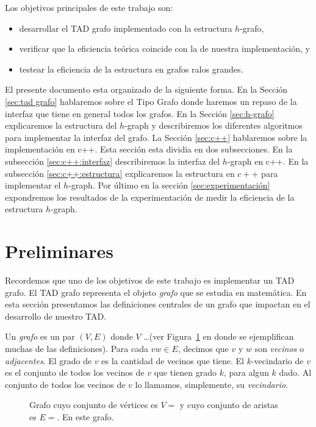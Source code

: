 \documentclass[a4paper,12pt]{article}
\begin{document}
Los objetivos principales de este trabajo son:
\begin{itemize}
  \item desarrollar el TAD grafo implementado con la estructura $h$-grafo,
  \item verificar que la eficiencia teórica coincide con la de nuestra implementación, y
  \item testear la eficiencia de la estructura en grafos ralos grandes.
\end{itemize}

El presente documento esta organizado de la siguiente forma.  En la Sección \ref{sec:tad grafo} hablaremos sobre el Tipo Grafo donde haremos un repaso de la interfaz que tiene en general todos los grafos.  En la Sección \ref{sec:h-grafo} explicaremos la estructura del $h$-graph y describiremos los diferentes algoritmos para implementar la interfaz del grafo. La Sección \ref{sec:c++} hablaremos sobre la implementación en c++. Esta sección esta dividia en dos subsecciones. En la subsección \ref{sec:c++:interfaz} describiremos la interfaz del $h$-graph en c++. En la subsección \ref{sec:c++:estructura} explicaremos la estructura en $c++$ para implementar el $h$-graph. Por último en la sección \ref{sec:experimentación} expondremos los resultados de la experimentación de medir la eficiencia de la estructura $h$-graph.

\section{Preliminares}
\label{sec:definiciones}

Recordemos que uno de los objetivos de este trabajo es implementar un TAD grafo.  El TAD grafo representa el objeto \emph{grafo} que se estudia en matemática.  En esta sección presentamos las definiciones centrales de un grafo que impactan en el desarrollo de nuestro TAD.

Un \emph{grafo} es un par $(V, E)$ donde $V$ \ldots (ver Figura~\ref{fig:definiciones} en donde se ejemplifican muchas de las definiciones).  Para cada $vw \in E$, decimos que $v$ y $w$ son \emph{vecinos} o \emph{adjacentes}.  El grado de $v$ es la cantidad de vecinos que tiene.  El $k$-vecindario de $v$ es el conjunto de todos los vecinos de $v$ que tienen grado $k$, para algun $k$ dado.  Al conjunto de todos los vecinos de $v$ lo llamamos, simplemente, su \emph{vecindario}.

\begin{figure}
  \centering

  \caption{Grafo cuyo conjunto de vértices es $V = $ y cuyo conjunto de aristas es $E =$.  En este grafo.}\label{fig:definiciones}
\end{figure}
\end{document}

